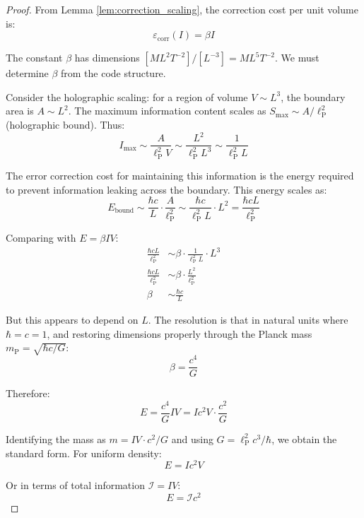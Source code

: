 \documentclass[12pt,a4paper]{article}
\theoremstyle{remark}
\newcommand{\lP}{\ell_{\text{P}}}
\newcommand{\mP}{m_{\text{P}}}
\begin{document}
\begin{proof}
From Lemma \ref{lem:correction_scaling}, the correction cost per unit volume is:
\begin{equation}
\varepsilon_{\text{corr}}(I) = \beta I
\end{equation}

The constant $\beta$ has dimensions $[ML^2T^{-2}]/[L^{-3}] = ML^5T^{-2}$. We must determine $\beta$ from the code structure.

Consider the holographic scaling: for a region of volume $V \sim L^3$, the boundary area is $A \sim L^2$. The maximum information content scales as $S_{\max} \sim A/\lP^2$ (holographic bound). Thus:
\begin{equation}
I_{\max} \sim \frac{A}{\lP^2 V} \sim \frac{L^2}{\lP^2 L^3} \sim \frac{1}{\lP^2 L}
\end{equation}

The error correction cost for maintaining this information is the energy required to prevent information leaking across the boundary. This energy scales as:
\begin{equation}
E_{\text{bound}} \sim \frac{\hbar c}{L} \cdot \frac{A}{\lP^2} \sim \frac{\hbar c}{\lP^2 L} \cdot L^2 = \frac{\hbar c L}{\lP^2}
\end{equation}

Comparing with $E = \beta I V$:
\begin{align}
\frac{\hbar c L}{\lP^2} &\sim \beta \cdot \frac{1}{\lP^2 L} \cdot L^3 \\
\frac{\hbar c L}{\lP^2} &\sim \beta \cdot \frac{L^2}{\lP^2} \\
\beta &\sim \frac{\hbar c}{L}
\end{align}

But this appears to depend on $L$. The resolution is that in natural units where $\hbar = c = 1$, and restoring dimensions properly through the Planck mass $\mP = \sqrt{\hbar c/G}$:
\begin{equation}
\beta = \frac{c^4}{G}
\end{equation}

Therefore:
\begin{equation}
E = \frac{c^4}{G} I V = I c^2 V \cdot \frac{c^2}{G}
\end{equation}

Identifying the mass as $m = IV \cdot c^2/G$ and using $G = \lP^2 c^3/\hbar$, we obtain the standard form. For uniform density:
\begin{equation}
E = Ic^2 V
\end{equation}

Or in terms of total information $\mathcal{I} = IV$:
\begin{equation}
\boxed{E = \mathcal{I}c^2}
\end{equation}
\end{proof}
\end{document}
